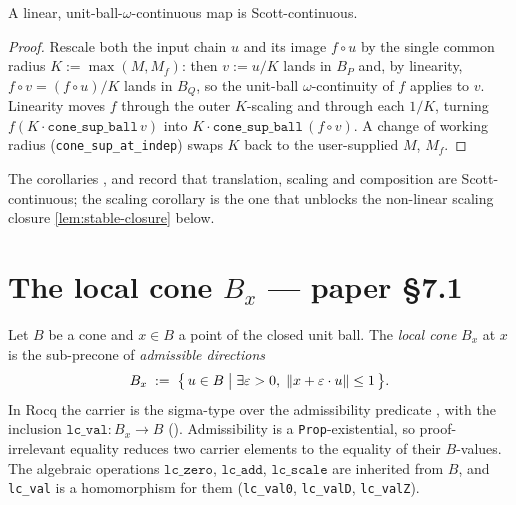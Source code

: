 \begin{lemma}\label{lem:linear-scott-of-omega}
\rocqok
{}
A linear, unit-ball-$\omega$-continuous map is Scott-continuous.
\end{lemma}

\begin{proof}
Rescale both the input chain $u$ and its image $f \circ u$ by the single
common radius $K := \max(M, M_f)$: then $v := u/K$ lands in $B_P$ and,
by linearity, $f \circ v = (f \circ u)/K$ lands in $B_Q$, so the
unit-ball $\omega$-continuity of $f$ applies to $v$. Linearity moves $f$
through the outer $K$-scaling and through each $1/K$, turning
$f(K \cdot \texttt{cone\_sup\_ball}\,v)$ into
$K \cdot \texttt{cone\_sup\_ball}\,(f \circ v)$. A change of working
radius (\texttt{cone\_sup\_at\_indep}) swaps $K$ back to the
user-supplied $M$, $M_f$.
\end{proof}

The corollaries ,
 and
 record that
translation, scaling and composition are Scott-continuous; the scaling
corollary is the one that unblocks the non-linear scaling closure
\autoref{lem:stable-closure} below.

\section{The local cone \texorpdfstring{$B_x$}{B_x} --- paper \S7.1}\label{sec:local-cone}

\begin{definition}\label{def:local-cone}
\rocqok{}
Let $B$ be a cone and $x \in B$ a point of the closed unit ball. The
\emph{local cone} $B_x$ at $x$ is the sub-precone of \emph{admissible
directions}
\[
  B_x \;:=\; \bigl\{\, u \in B \;\big|\; \exists \varepsilon > 0,\;
  \lVert x + \varepsilon \cdot u \rVert \leq 1 \,\bigr\}.
\]
In Rocq the carrier is the sigma-type
 over the admissibility
predicate , with the inclusion
$\texttt{lc\_val} : B_x \to B$
(). Admissibility is a
\texttt{Prop}-existential, so proof-irrelevant equality
 reduces two carrier elements to
the equality of their $B$-values. The algebraic operations
$\texttt{lc\_zero}$, $\texttt{lc\_add}$, $\texttt{lc\_scale}$ are
inherited from $B$, and \texttt{lc\_val} is a homomorphism for them
(\texttt{lc\_val0}, \texttt{lc\_valD}, \texttt{lc\_valZ}).
\end{definition}

